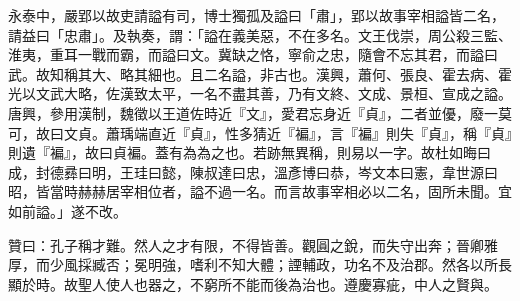 \begin{pinyinscope}
 永泰中，嚴郢以故吏請謚有司，博士獨孤及謚曰「肅」，郢以故事宰相謚皆二名，請益曰「忠肅」。及執奏，謂：「謚在義美惡，不在多名。文王伐崇，周公殺三監、淮夷，重耳一戰而霸，而謚曰文。冀缺之恪，寧俞之忠，隨會不忘其君，而謚曰武。故知稱其大、略其細也。且二名謚，非古也。漢興，蕭何、張良、霍去病、霍光以文武大略，佐漢致太平，一名不盡其善，乃有文終、文成、景桓、宣成之謚。唐興，參用漢制，魏徵以王道佐時近『文』，愛君忘身近『貞』，二者並優，廢一莫可，故曰文貞。蕭瑀端直近『貞』，性多猜近『褊』，言『褊』則失『貞』，稱『貞』則遺『褊』，故曰貞褊。蓋有為為之也。若跡無異稱，則易以一字。故杜如晦曰成，封德彞曰明，王珪曰懿，陳叔達曰忠，溫彥博曰恭，岑文本曰憲，韋世源曰昭，皆當時赫赫居宰相位者，謚不過一名。而言故事宰相必以二名，固所未聞。宜如前謚。」遂不改。



 贊曰：孔子稱才難。然人之才有限，不得皆善。觀圓之銳，而失守出奔；晉卿雅厚，而少風採臧否；冕明強，嗜利不知大體；諲輔政，功名不及治郡。然各以所長顯於時。故聖人使人也器之，不窮所不能而後為治也。遵慶寡疵，中人之賢與。



\end{pinyinscope}